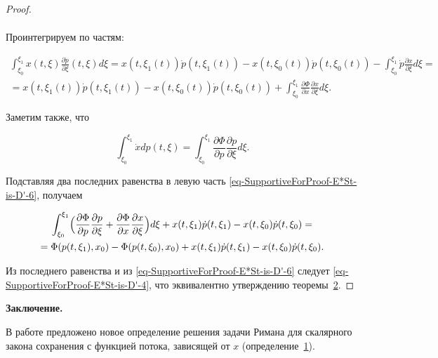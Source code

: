 \begin{proof}
\begin{multline}
\end{multline}

Проинтегрируем по частям:

\begin{multline}

\int _{\xi_0}^{\xi_1}x(t,\xi)\frac{\partial\dot{p}}{\partial\xi}(t,\xi)d\xi=x(t,\xi_1(t))\dot{p}(t,\xi_1(t))-x(t,\xi_0(t))\dot{p}(t,\xi_0(t))-\int _{\xi_0}^{\xi_1}\dot{p}\frac{\partial x}{\partial\xi}d\xi=

\\

=x(t,\xi_1(t))\dot{p}(t,\xi_1(t))-x(t,\xi_0(t))\dot{p}(t,\xi_0(t))+\int _{\xi_0}^{\xi_1}\frac{\partial\Phi}{\partial x}\frac{\partial x}{\partial\xi}d\xi.

\end{multline}

Заметим также, что

$$

\int _{\xi_0}^{\xi_1}\dot{x}dp(t,\xi)=\int _{\xi_0}^{\xi_1}\frac{\partial\Phi}{\partial p}\frac{\partial p}{\partial\xi}d\xi.

$$

Подставляя два последних равенства в левую часть \eqref{eq-SupportiveForProof-E*St-is-D'-6}, получаем

\begin{multline}

\int _{\xi_0}^{\xi_1}\Bigl(\frac{\partial\Phi}{\partial p}\frac{\partial p}{\partial\xi}+\frac{\partial\Phi}{\partial x}\frac{\partial x}{\partial\xi}\Bigr) d\xi+x(t,\xi_1)\dot{p}(t,\xi_1)-x(t,\xi_0)\dot{p}(t,\xi_0)=

\\

=\Phi(p(t,\xi_1),x_0)-\Phi(p(t,\xi_0),x_0)+x(t,\xi_1)\dot{p}(t,\xi_1)-x(t,\xi_0)\dot{p}(t,\xi_0).

\end{multline}

Из последнего равенства и из \eqref{eq-SupportiveForProof-E*St-is-D'-6} следует \eqref{eq-SupportiveForProof-E*St-is-D'-4}, что эквивалентно утверждению теоремы~\hyperlink{newthm2}{2}. \hfill\end{proof}



\smallskip







{\bf Заключение.}

В работе предложено новое определение решения задачи Римана для скалярного закона сохранения с функцией потока, зависящей от $x$ (определение~\hyperlink{palin:definition1}{1}). 

